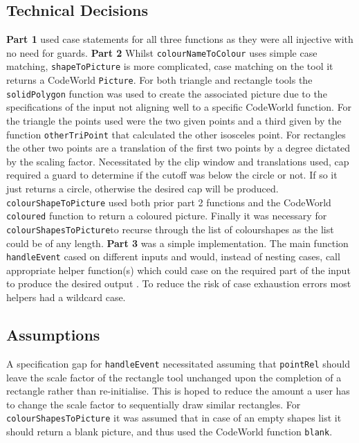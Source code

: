 \documentclass[11pt]{article}
\begin{document}
\subsection{Technical Decisions}
\textbf{Part 1} used case statements for all three functions as they were all injective with no need for guards.
 \textbf{Part 2} Whilst \verb|colourNameToColour| uses simple case matching, \verb|shapeToPicture| is more complicated, case matching on the tool it returns a CodeWorld \verb|Picture|. For both triangle and rectangle tools the \verb|solidPolygon| function was used to create the associated picture due to the specifications of the input not aligning well to a specific CodeWorld function. For the triangle the points used were the two given points and a third given by the function \verb|otherTriPoint| that calculated the other isosceles point. For rectangles the other two points are a translation of the first two points by a degree dictated by the scaling factor. Necessitated by the clip window and translations used, cap required a guard to determine if the cutoff was below the circle or not. If so it just returns a circle, otherwise the desired cap will be produced. \verb|colourShapeToPicture| used both prior part 2 functions and the CodeWorld  \verb|coloured| function to return a coloured picture. Finally it was necessary for  \verb|colourShapesToPicture|to recurse through the list of colourshapes as the list could be of any length.
 \textbf{Part 3} was a simple implementation. The main function \verb|handleEvent| cased on different inputs and would, instead of nesting cases, call appropriate helper function(s) which could case on the required part of the input to produce the desired output .  To reduce the risk of case exhaustion errors most helpers had a wildcard case.

 \subsection{Assumptions}%
A specification gap for \verb|handleEvent| necessitated assuming that \verb|pointRel| should leave the scale factor of the rectangle tool unchanged upon the completion of a rectangle rather than re-initialise. This is hoped to reduce the amount a user has to change the scale factor to sequentially draw similar rectangles. For \verb|colourShapesToPicture| it was assumed that in case of an empty shapes list it should return a blank picture, and thus used the CodeWorld function \verb|blank|.
\end{document}
